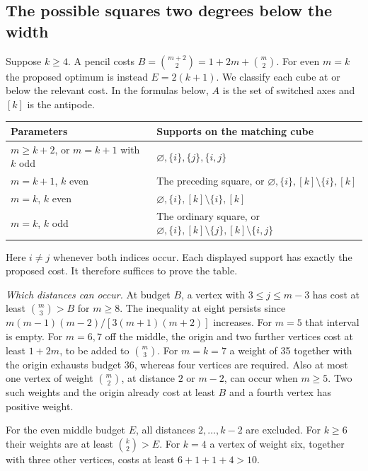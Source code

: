 \documentclass[11pt,letterpaper]{article}
\numberwithin{equation}{section}
\begin{document}
\subsection{The possible squares two degrees below the width}\label{sec:two}

Suppose $k\ge4$. A pencil costs $B=\binom{m+2}{2}=1+2m+\binom m2$. For even $m=k$ the proposed
optimum is instead $E=2(k+1)$. We classify each cube at or below the relevant cost. In the
formulas below, $A$ is the set of switched axes and $[k]$ is the antipode.

\begin{center}\normalfont
\begin{tabularx}{\linewidth}{@{}p{.43\linewidth}X@{}}
\toprule
Parameters & Supports on the matching cube \\
\midrule
$m\ge k+2$, or $m=k+1$ with $k$ odd & $\varnothing,\{i\},\{j\},\{i,j\}$ \\
$m=k+1$, $k$ even & The preceding square, or $\varnothing,\{i\},[k]\setminus\{i\},[k]$ \\
$m=k$, $k$ even & $\varnothing,\{i\},[k]\setminus\{i\},[k]$ \\
$m=k$, $k$ odd & The ordinary square, or $\varnothing,\{i\},[k]\setminus\{j\},[k]\setminus\{i,j\}$ \\
\bottomrule
\end{tabularx}
\end{center}

Here $i\ne j$ whenever both indices occur. Each displayed support has exactly the proposed cost. It therefore suffices to prove the table.

\emph{Which distances can occur.} At budget $B$, a vertex with $3\le j\le m-3$ has cost at least $\binom m3>B$ for $m\ge8$. The inequality at eight persists since $m(m-1)(m-2)/[3(m+1)(m+2)]$ increases. For $m=5$ that interval is empty. For $m=6,7$ off the middle, the origin and two further vertices cost at least $1+2m$, to be added to $\binom m3$. For $m=k=7$ a weight of 35 together with the origin exhausts budget 36, whereas four vertices are required. Also at most one vertex of weight $\binom m2$, at distance $2$ or $m-2$, can occur when $m\ge5$. Two such weights and the origin already cost at least $B$ and a fourth vertex has positive weight.

For the even middle budget $E$, all distances $2,\dots,k-2$ are excluded. For $k\ge6$ their
weights are at least $\binom k2>E$. For $k=4$ a vertex of weight six, together with three
other vertices, costs at least $6+1+1+4>10$.
\end{document}
